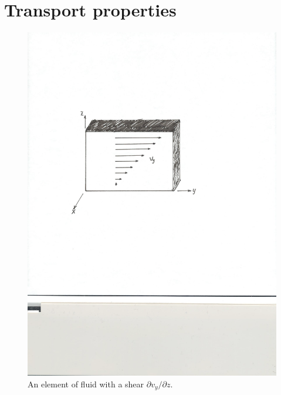 \section{Transport properties}

\begin{figure}[htbp]
\includegraphics[width=\textwidth]{shear-diagram}
\caption{An element of fluid with a shear $\partial v_{y}/\partial z$.}\label{f.shear-diagram}
\end{figure}

